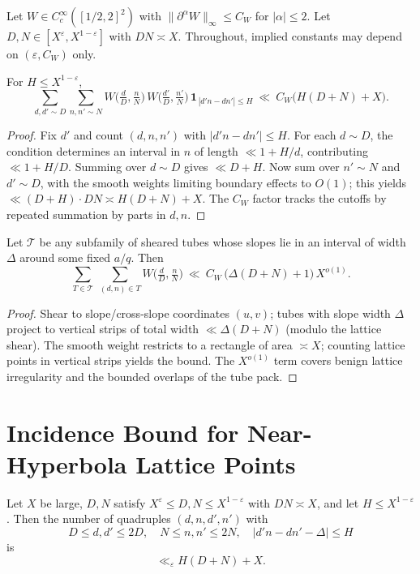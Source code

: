 Let $W\in C_c^\infty([1/2,2]^2)$ with $\|\partial^\alpha W\|_\infty\le C_W$ for $|\alpha|\le 2$. Let $D,N\in[X^\varepsilon,X^{1-\varepsilon}]$ with $DN\asymp X$. Throughout, implied constants may depend on $(\varepsilon, C_W)$ only.

\begin{lemma}\label{lem:incidence}
For $H\le X^{1-\varepsilon}$,
\[
\sum_{d,d'\sim D}\sum_{n,n'\sim N}
W\!\Big(\tfrac dD,\tfrac nN\Big)\,W\!\Big(\tfrac{d'}D,\tfrac{n'}N\Big)\,\mathbf 1_{\,|d'n-d n'|\le H}
\ \ll\ C_W\big(H(D+N)+X\big).
\]
\end{lemma}

\begin{proof}
Fix $d'$ and count $(d,n,n')$ with $|d'n-dn'|\le H$. For each $d\sim D$, the condition determines an interval in $n$ of length $\ll 1+H/d$, contributing $\ll 1+H/D$. Summing over $d\sim D$ gives $\ll D+H$. Now sum over $n'\sim N$ and $d'\sim D$, with the smooth weights limiting boundary effects to $O(1)$; this yields $\ll (D+H)\cdot DN\asymp H(D+N)+X$. The $C_W$ factor tracks the cutoffs by repeated summation by parts in $d,n$.
\end{proof}

\begin{lemma}\label{lem:BG.degeneracy}
Let $\mathcal T$ be any subfamily of sheared tubes whose slopes lie in an interval of width $\Delta$ around some fixed $a/q$. Then
\[
\sum_{T\in\mathcal T}\ \sum_{(d,n)\in T} W\!\Big(\tfrac dD,\tfrac nN\Big)
\ \ll\ C_W\,\big(\Delta(D+N)+1\big)\,X^{o(1)}.
\]
\end{lemma}

\begin{proof}
Shear to slope/cross-slope coordinates $(u,v)$; tubes with slope width $\Delta$ project to vertical strips of total width $\ll \Delta(D+N)$ (modulo the lattice shear). The smooth weight restricts to a rectangle of area $\asymp X$; counting lattice points in vertical strips yields the bound. The $X^{o(1)}$ term covers benign lattice irregularity and the bounded overlaps of the tube pack.
\end{proof}

\section{Incidence Bound for Near-Hyperbola Lattice Points}

\begin{lemma}\label{lem:incidence}
Let $X$ be large, $D,N$ satisfy $X^{\varepsilon}\le D,N\le X^{1-\varepsilon}$ with $DN\asymp X$, and let $H\le X^{1-\varepsilon}$.  
Then the number of quadruples $(d,n,d',n')$ with
\[
D\le d,d'\le 2D,\quad N\le n,n'\le 2N,\quad
|d'n - dn' - \Delta|\le H
\]
is
\[
\ll_\varepsilon H(D+N) + X.
\]
\end{lemma}

